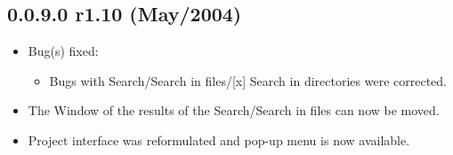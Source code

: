 \subsection*{0.0.9.0 r1.10 (May/2004)}
\begin{itemize}
  \item Bug(s) fixed:
    \begin{itemize}
      \item Bugs with Search/Search in files/[x] Search in directories were corrected.
    \end{itemize}
  \item The Window of the results of the Search/Search in files can now be moved.
  \item Project interface was reformulated and pop-up menu is now available.
\end{itemize}


